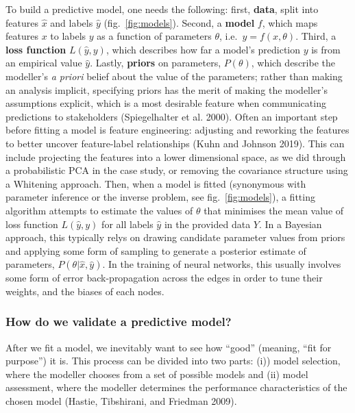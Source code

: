 \documentclass[11pt]{article}
\begin{document}
To build a predictive model, one needs the following: first,
\textbf{data}, split into features \(\hat{x}\) and labels \(\hat{y}\)
(fig.~\ref{fig:models}). Second, a \textbf{model} \(f\), which maps
features \(x\) to labels \(y\) as a function of parameters \(\theta\),
i.e.~\(y = f(x, \theta)\). Third, a \textbf{loss function}
\(L(\hat{y}, y)\), which describes how far a model's prediction \(y\) is
from an empirical value \(\hat{y}\). Lastly, \textbf{priors} on
parameters, \(P(\theta)\), which describe the modeller's \emph{a priori}
belief about the value of the parameters; rather than making an analysis
implicit, specifying priors has the merit of making the modeller's
assumptions explicit, which is a most desirable feature when
communicating predictions to stakeholders (Spiegelhalter et al. 2000).
Often an important step before fitting a model is feature engineering:
adjusting and reworking the features to better uncover feature-label
relationships (Kuhn and Johnson 2019). This can include projecting the
features into a lower dimensional space, as we did through a
probabilistic PCA in the case study, or removing the covariance
structure using a Whitening approach. Then, when a model is fitted
(synonymous with parameter inference or the inverse problem, see
fig.~\ref{fig:models}), a fitting algorithm attempts to estimate the
values of \(\theta\) that minimises the mean value of loss function
\(L(\hat{y},y)\) for all labels \(\hat{y}\) in the provided data \(Y\).
In a Bayesian approach, this typically relys on drawing candidate
parameter values from priors and applying some form of sampling to
generate a posterior estimate of parameters,
\(P(\theta | \hat{x}, \hat{y})\). In the training of neural networks,
this usually involves some form of error back-propagation across the
edges in order to tune their weights, and the biases of each nodes.

\hypertarget{how-do-we-validate-a-predictive-model}{%
\subsubsection{How do we validate a predictive
model?}\label{how-do-we-validate-a-predictive-model}}

After we fit a model, we inevitably want to see how ``good'' (meaning,
``fit for purpose'') it is. This process can be divided into two parts:
(i)) model selection, where the modeller chooses from a set of possible
models and (ii) model assessment, where the modeller determines the
performance characteristics of the chosen model (Hastie, Tibshirani, and
Friedman 2009).
\end{document}

